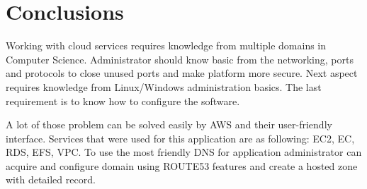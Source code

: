 \chapter{Conclusions} \label{chp:summary}
	Working with cloud services requires knowledge from multiple domains in Computer Science. Administrator should know basic from the networking, ports and protocols to close unused ports and make platform more secure. Next aspect requires knowledge from Linux/Windows administration basics. The last requirement is to know how to configure the software. 
	
	A lot of those problem can be solved easily by \gls{AWS} and their user-friendly interface. Services that were used for this application are as following: \gls{EC2}, \gls{EC}, \gls{RDS}, \gls{EFS}, \gls{VPC}. To use the most friendly \gls{DNS} for application administrator can acquire and configure domain using \gls{ROUTE53} features and create a hosted zone with detailed record.